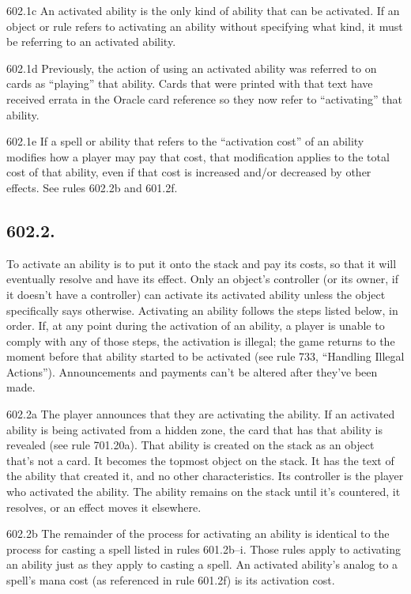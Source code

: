 602.1c An activated ability is the only kind of ability that can be activated. If an object or rule refers to activating an ability without specifying what kind, it must be referring to an activated ability.

602.1d Previously, the action of using an activated ability was referred to on cards as “playing” that ability. Cards that were printed with that text have received errata in the Oracle card reference so they now refer to “activating” that ability.

602.1e If a spell or ability that refers to the “activation cost” of an ability modifies how a player may pay that cost, that modification applies to the total cost of that ability, even if that cost is increased and/or decreased by other effects. See rules 602.2b and 601.2f.

\subsection*{602.2.}
To activate an ability is to put it onto the stack and pay its costs, so that it will eventually resolve and have its effect. Only an object’s controller (or its owner, if it doesn’t have a controller) can activate its activated ability unless the object specifically says otherwise. Activating an ability follows the steps listed below, in order. If, at any point during the activation of an ability, a player is unable to comply with any of those steps, the activation is illegal; the game returns to the moment before that ability started to be activated (see rule 733, “Handling Illegal Actions”). Announcements and payments can’t be altered after they’ve been made.

602.2a The player announces that they are activating the ability. If an activated ability is being activated from a hidden zone, the card that has that ability is revealed (see rule 701.20a). That ability is created on the stack as an object that’s not a card. It becomes the topmost object on the stack. It has the text of the ability that created it, and no other characteristics. Its controller is the player who activated the ability. The ability remains on the stack until it’s countered, it resolves, or an effect moves it elsewhere.

602.2b The remainder of the process for activating an ability is identical to the process for casting a spell listed in rules 601.2b–i. Those rules apply to activating an ability just as they apply to casting a spell. An activated ability’s analog to a spell’s mana cost (as referenced in rule 601.2f) is its activation cost.

